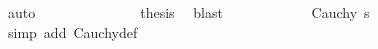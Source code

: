 \begin{isabellebody}
\ auto\isanewline
\ \ \ \ \ \ \isacommand{{\isacharbraceright}{\kern0pt}}\isamarkupfalse%
\isanewline
\ \ \ \ \ \ \isamarkupfalse%
\ {\isacharquery}{\kern0pt}thesis\ \isamarkupfalse%
\ blast\isanewline
\ \ \ \ \isamarkupfalse%
\isanewline
\ \ \ \ \isamarkupfalse%
\ \isamarkupfalse%
\ {\isachardoublequoteopen}Cauchy\ s{\isachardoublequoteclose}\ \isamarkupfalse%
\ {\isacharparenleft}{\kern0pt}simp\ add{\isacharcolon}{\kern0pt}\ Cauchy{\isacharunderscore}{\kern0pt}def{\isacharparenright}{\kern0pt}\isanewline
\ \ \isamarkupfalse%
\ \ \ \ \ \ \ \ \ \ \ \ \isanewline
{}\isamarkupfalse%
%
\endisatagproof
{\isafoldproof}%
%
\isadelimproof
\isanewline
%
\endisadelimproof
%
\isadelimtheory
\ \ \isanewline
%
\endisadelimtheory
%
\isatagtheory
{}\isamarkupfalse%
%
\endisatagtheory
{\isafoldtheory}%
%
\isadelimtheory
%
\endisadelimtheory
%
\end{isabellebody}%
\endinput
